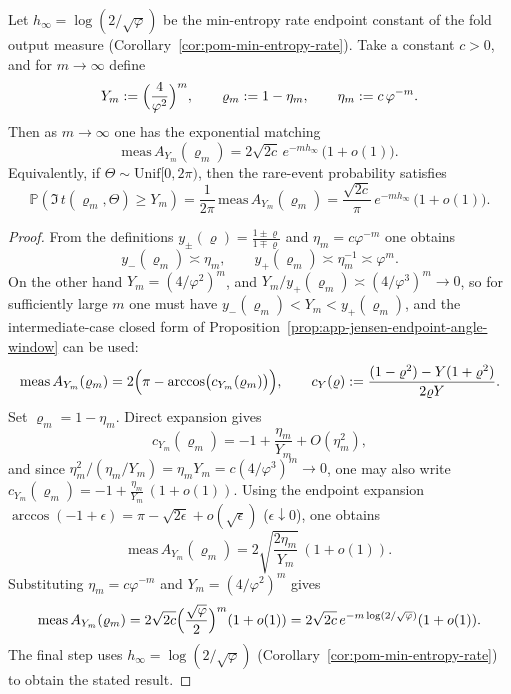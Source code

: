 \begin{theorem}\label{thm:app-endpoint-window-hinfty-match}
Let \(h_\infty=\log(2/\sqrt{\varphi})\) be the min-entropy rate endpoint constant of the fold output measure (Corollary~\ref{cor:pom-min-entropy-rate}).
Take a constant \(c>0\), and for \(m\to\infty\) define
\[
Y_m:=\Bigl(\frac{4}{\varphi^{2}}\Bigr)^{m},
\qquad
\varrho_m:=1-\eta_m,\qquad \eta_m:=c\,\varphi^{-m}.
\]
Then as \(m\to\infty\) one has the exponential matching
\[
\mathrm{meas}\,A_{Y_m}(\varrho_m)
=2\sqrt{2c}\,e^{-m h_\infty}\,\bigl(1+o(1)\bigr).
\]
Equivalently, if \(\Theta\sim\mathrm{Unif}[0,2\pi)\), then the rare-event probability satisfies
\[
\mathbb{P}\!\left(\Im\,t(\varrho_m,\Theta)\ge Y_m\right)
=\frac{1}{2\pi}\,\mathrm{meas}\,A_{Y_m}(\varrho_m)
=\frac{\sqrt{2c}}{\pi}\,e^{-m h_\infty}\,\bigl(1+o(1)\bigr).
\]
\end{theorem}

\begin{proof}
From the definitions \(y_\pm(\varrho)=\frac{1\pm\varrho}{1\mp\varrho}\) and \(\eta_m=c\varphi^{-m}\) one obtains
\[
y_-(\varrho_m)\asymp \eta_m,\qquad
y_+(\varrho_m)\asymp \eta_m^{-1}\asymp \varphi^{m}.
\]
On the other hand \(Y_m=(4/\varphi^2)^m\), and
\(
Y_m/y_+(\varrho_m)\asymp (4/\varphi^3)^m\to 0
\), so for sufficiently large \(m\) one must have \(y_-(\varrho_m)<Y_m<y_+(\varrho_m)\), and the intermediate-case closed form of Proposition~\ref{prop:app-jensen-endpoint-angle-window} can be used:
\[
\mathrm{meas}\,A_{Y_m}(\varrho_m)
=2\Bigl(\pi-\arccos\bigl(c_{Y_m}(\varrho_m)\bigr)\Bigr),
\qquad
c_Y(\varrho):=\frac{(1-\varrho^2)-Y(1+\varrho^2)}{2\varrho Y}.
\]
Set \(\varrho_m=1-\eta_m\). Direct expansion gives
\[
c_{Y_m}(\varrho_m)
=-1+\frac{\eta_m}{Y_m}+O(\eta_m^2),
\]
and since
\(
\eta_m^2/(\eta_m/Y_m)=\eta_m Y_m=c(4/\varphi^3)^m\to 0
\), one may also write
\(
c_{Y_m}(\varrho_m)=-1+\frac{\eta_m}{Y_m}\,(1+o(1))
\).
Using the endpoint expansion \(\arccos(-1+\epsilon)=\pi-\sqrt{2\epsilon}+o(\sqrt\epsilon)\) (\(\epsilon\downarrow 0\)), one obtains
\[
\mathrm{meas}\,A_{Y_m}(\varrho_m)
=2\sqrt{\frac{2\eta_m}{Y_m}}\,(1+o(1)).
\]
Substituting \(\eta_m=c\varphi^{-m}\) and \(Y_m=(4/\varphi^2)^m\) gives
\[
\mathrm{meas}\,A_{Y_m}(\varrho_m)
=2\sqrt{2c}\Bigl(\frac{\sqrt{\varphi}}{2}\Bigr)^m(1+o(1))
=2\sqrt{2c}\,e^{-m\log(2/\sqrt{\varphi})}(1+o(1)).
\]
The final step uses \(h_\infty=\log(2/\sqrt{\varphi})\) (Corollary~\ref{cor:pom-min-entropy-rate}) to obtain the stated result.
\end{proof}

